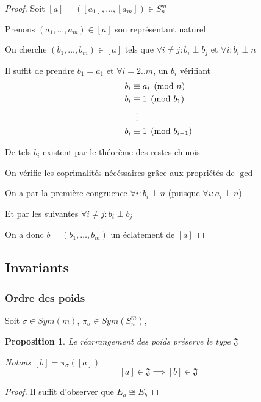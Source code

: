 \documentclass{article}
\newtheorem{proposition}{Proposition}
\begin{document}
\begin{proof}
    Soit $[a] = ([a_1], \dots, [a_m]) \in S_n^m$

    Prenons $(a_1, \dots, a_m) \in [a]$ son représentant naturel

    On cherche $(b_1, \dots, b_m) \in [a]$ tels que $\forall i \neq j : b_i \perp b_j$ et $\forall i : b_i \perp n$

    Il suffit de prendre $b_1 = a_1$ et $\forall i = 2..m$, un $b_i$ vérifiant
    \begin{align*}
        b_i & \equiv a_i \pmod n \\
        b_i & \equiv 1 \pmod {b_1} \\
            & \vdotswithin{\equiv} \\
        b_i & \equiv 1 \pmod {b_{i-1}} 
    \end{align*}

    De tels $b_i$ existent par le théorème des restes chinois

    On vérifie les coprimalités nécéssaires grâce aux propriétés de $\gcd$

    On a par la première congruence $\forall i : b_i \perp n$ (puisque $\forall i : a_i \perp n$)

    Et par les suivantes $\forall i \neq j : b_i \perp b_j$

    On a donc $b = (b_1, \dots, b_m)$ un éclatement de $[a]$
\end{proof}

\newpage

\subsection{Invariants}

\subsubsection{Ordre des poids}

Soit $\sigma \in Sym(m)$, $\pi_{\sigma} \in Sym(S_n^m)$, 

\begin{proposition}
    Le réarrangement des poids préserve le type $\mathfrak{J}$

    Notons $[b] = \pi_{\sigma}([a])$
    \[ [a] \in \mathfrak{J} \implies [b] \in \mathfrak{J} \]
\end{proposition}

\begin{proof}
    Il suffit d'observer que $E_a \cong E_b$
\end{proof}
\end{document}
